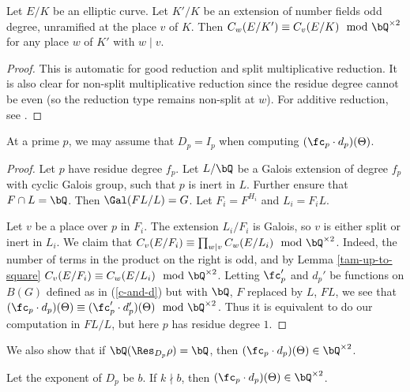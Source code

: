\begin{lemma}\label{tam-up-to-square}
    Let $E / K$ be an elliptic curve. Let $K' / K$ be an extension of number fields odd degree, unramified at the place $v$ of $K$. Then $C_w(E / K') \equiv C_v(E / K) \mod \bQ^{\times 2}$ for any place $w$ of $K'$ with $ w \mid v$. 
\end{lemma}

\begin{proof}
This is automatic for good reduction and split multiplicative reduction. It is also clear for non-split multiplicative reduction since the residue degree cannot be even (so the reduction type remains non-split at $w$). For additive reduction, see \cite[Lemma 3.12]{reg-const}.
\end{proof}

\begin{lemma}\label{DeqI}
    At a prime $p$, we may assume that $D_p = I_p$ when computing $(\fc_p \cdot d_p)(\Theta)$. 
\end{lemma}

\begin{proof}
Let $p$ have residue degree $f_p$. Let $L / \bQ$ be a Galois extension of degree $f_p$ with cyclic Galois group, such that $p$ is inert in $L$. Further ensure that $F \cap L = \bQ$. Then $\Gal(FL / L) = G$. Let $F_i = F^{H_i}$ and $L_i = F_i L$.

Let $v$ be a place over $p$ in $F_i$. The extension $L_i / F_i$ is Galois, so $v$ is either split or inert in $L_i$.
We claim that $C_v(E / F_i) \equiv \prod_{w | v} C_w(E / L_i) \mod \bQ^{\times 2}$. Indeed, the number of terms in the product on the right is odd, and by Lemma \ref{tam-up-to-square} $C_v(E / F_i) \equiv C_w(E / L_i) \mod \bQ^{\times 2}$. 
Letting $\fc_p'$ and $d_p'$ be functions on $B(G)$ defined as in (\ref{c-and-d}) but with $\bQ$, $F$ replaced by $L$, $FL$, we see that $(\fc_p \cdot d_p)(\Theta) \equiv (\fc_p' \cdot d_p')(\Theta) \mod \bQ^{\times 2}$. 
Thus it is equivalent to do our computation in $FL / L$, but here $p$ has residue degree $1$.
\end{proof}

We also show that if $\bQ(\Res_{D_p} \rho) = \bQ$, then $(\fc_p \cdot d_p)(\Theta) \in \bQ^{\times 2}$.

\begin{lemma}\label{rational-res}
    Let the exponent of $D_p$ be $b$. If $k \nmid b$, then $(\fc_p \cdot d_p)(\Theta) \in \bQ^{\times 2}$. 
\end{lemma}

